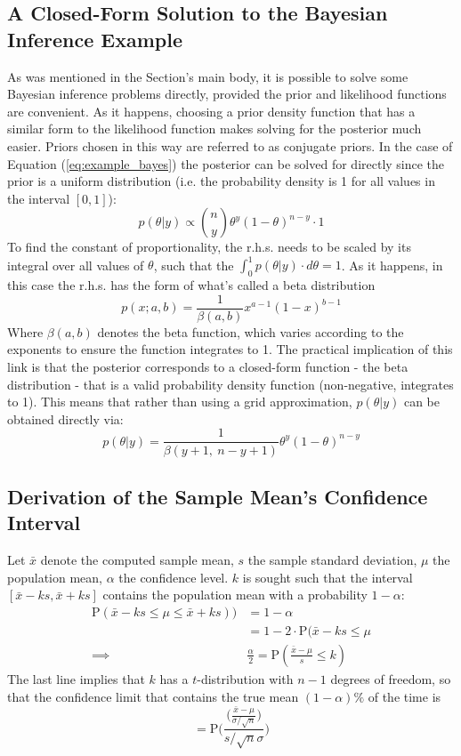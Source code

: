 \documentclass[11pt,a4paper,article]{memoir} %
\begin{document}
\subsection{A Closed-Form Solution to the Bayesian Inference Example}
As was mentioned in the Section's main body, it is possible to solve some Bayesian inference problems directly, provided the prior and likelihood functions are convenient. As it happens, choosing a prior density function that has a similar form to the likelihood function makes solving for the posterior much easier. Priors chosen in this way are referred to as conjugate priors. In the case of Equation (\ref{eq:example_bayes}) the posterior can be solved for directly since the prior is a uniform distribution (i.e. the probability density is 1 for all values in the interval $[0, 1]$):
\[
  p(\theta|y) \propto \binom{n}{y}\theta^y (1 - \theta)^{n-y}\cdot 1
\]
To find the constant of proportionality, the r.h.s. needs to be scaled by its integral over all values of $\theta$, such that the $\int_0^1 p(\theta|y)\cdot d\theta = 1$. As it happens, in this case the r.h.s. has the form of what's called a beta distribution
\[
  p(x; a, b) = \frac{1}{\beta(a, b)} x^{a - 1} (1-x)^{b-1} 
\]
Where $\beta(a,b)$ denotes the beta function, which varies according to the exponents to ensure the function integrates to 1. The practical implication of this link is that the posterior corresponds to a closed-form function - the beta distribution - that is a valid probability density function (non-negative, integrates to 1). This means that rather than using a grid approximation, $p(\theta|y)$ can be obtained directly via:
\[
  p(\theta|y) = \frac{1}{\beta(y + 1, \ n - y + 1)} \theta^{y} (1-\theta)^{n - y} 	
\]

\subsection{Derivation of the Sample Mean's Confidence Interval}
Let $\bar{x}$ denote the computed sample mean, $s$ the sample standard deviation, $\mu$ the population mean, $\alpha$ the confidence level. $k$ is sought such that the interval $[\bar{x} - ks, \bar{x} + ks]$ contains the population mean with a probability $1 - \alpha$:
\begin{align}
	\text{P}(\bar{x} - ks \leq \mu \leq \bar{x} + ks) ) &= 1 - \alpha \nonumber\\
	&= 1 - 2\cdot \text{P}(\bar{x} - ks \leq \mu \nonumber \\
	\implies &\frac{\alpha}{2} = \text{P}(\frac{\bar{x} - \mu}{s} \leq k) \nonumber
\end{align}
The last line implies that $k$ has a $t$-distribution with $n - 1$ degrees of freedom, so that the confidence limit that contains the true mean $(1 - \alpha)\%$ of the time is
\begin{equation}
	[\bar{x} - t_{n-1}(\alpha)\cdot s, \ \bar{x} + t_{n-1}(\alpha)\cdot s]
\end{equation}
\[
	 = \text{P}\Bigg(\frac{\Big(\frac{\bar{x} - \mu}{\sigma/\sqrt{n}}\Big)}{s/\sqrt{n}\sigma}\Bigg)
\]
\end{document}
